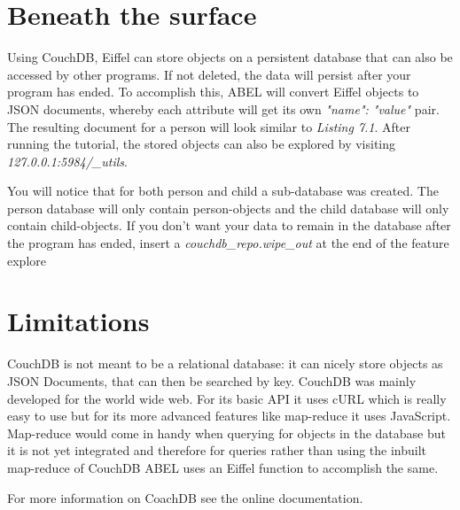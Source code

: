 \documentclass[a4paper,12pt]{report}
\begin{document}
\section{Beneath the surface}

Using CouchDB, Eiffel can store objects on a persistent database that can also be accessed by other programs. If not deleted, the data will persist after your program has ended.
To accomplish this, ABEL will convert Eiffel objects to JSON documents, whereby each attribute will get its own \emph{"name": "value"} pair. The resulting document for a person will look similar to \emph{Listing 7.1}. After running the tutorial, the stored objects can also be explored by visiting \emph{127.0.0.1:5984/\_utils}.

You will notice that for both person and child a sub-database was created. The person database will only contain person-objects and the child database will only contain child-objects.
If you don't want your data to remain in the database after the program has ended, insert a \emph{couchdb\_repo.wipe\_out} at the end of the feature explore

\section{Limitations}

CouchDB is not meant to be a relational database: it can nicely store objects as JSON Documents, that can then be searched by key. 
CouchDB was mainly developed for the world wide web. For its basic API it uses cURL which is really easy to use but for its more advanced features like map-reduce it uses JavaScript. Map-reduce would come in handy when querying for objects in the database but it is not yet integrated and therefore for queries rather than using the inbuilt map-reduce of CouchDB ABEL uses an Eiffel function to accomplish the same. 

For more information on CoachDB see the online documentation.

%

%

%  
\end{document}
